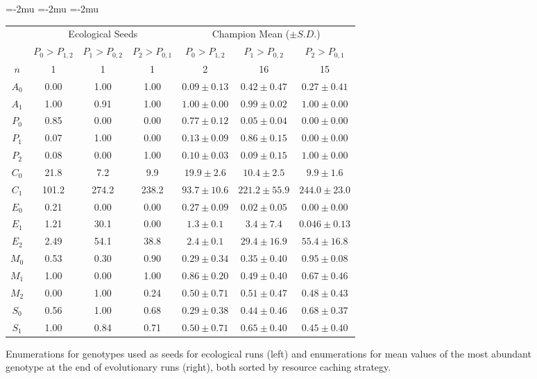 \begin{figure}[t]

\begin{center}
\setlength\tabcolsep{1.5pt} %
\medmuskip=-2mu
\thinmuskip=-2mu
\thickmuskip=-2mu
\nulldelimiterspace=-1pt
\scriptspace=0pt
\begin{tabular}{ | c || c c c | c c c | }
  \multicolumn{1}{c}{} & \multicolumn{3}{c}{Ecological Seeds} & \multicolumn{3}{c}{Champion Mean ($\pm S.D.$)} \\
 \cline{2-7}
  \multicolumn{1}{c|}{} & \tiny{$P_0 > P_{1,2}$} & \tiny{$P_1 > P_{0,2}$} & \tiny{$P_2 > P_{0,1}$} & \tiny{$P_0 > P_{1,2}$} & \tiny{$P_1 > P_{0,2}$} & \tiny{$P_2 > P_{0,1}$}  \\
 \hline
 $n$ & 1 & 1 & 1 & 2 & 16 & 15  \\
 \hhline{|=||===|===|}
 $A_0$ & 0.00 & 1.00 & 1.00 & $0.09 \pm 0.13$ & $0.42 \pm 0.47$ & $0.27 \pm 0.41$ \\
 $A_1$ & 1.00 & 0.91 & 1.00 & $1.00 \pm  0.00$ & $0.99 \pm 0.02$ & $1.00 \pm 0.00$ \\
 \hline
 $P_0$ & 0.85 & 0.00 & 0.00 & $0.77 \pm 0.12$ & $0.05 \pm 0.04$ & $0.00 \pm 0.00$ \\
 $P_1$ & 0.07 & 1.00 & 0.00 & $0.13 \pm 0.09$ & $0.86 \pm 0.15$ & $0.00 \pm 0.00$ \\
 $P_2$ & 0.08 & 0.00 & 1.00 & $0.10 \pm 0.03$ & $0.09 \pm 0.15$ & $1.00 \pm 0.00$ \\
 \hline
 $C_0$ & 21.8 & 7.2 & 9.9 & $19.9 \pm 2.6$ & $10.4 \pm 2.5$ & $9.9 \pm 1.6$ \\
 $C_1$ & 101.2 & 274.2 & 238.2 & $93.7 \pm 10.6$ & $221.2 \pm 55.9$ & $244.0 \pm 23.0 $ \\
 \hline
 $E_0$ & 0.21 & 0.00 & 0.00 & $0.27 \pm 0.09$ & $0.02 \pm 0.05$ & $0.00 \pm 0.00$ \\
 $E_1$ & 1.21 & 30.1 & 0.00 & $1.3 \pm 0.1$ & $3.4 \pm 7.4$ & $0.046 \pm 0.13$ \\
 $E_2$ & 2.49 & 54.1 & 38.8 & $2.4 \pm 0.1$ & $29.4 \pm 16.9$ & $55.4 \pm 16.8$ \\
 \hline
 $M_0$ & 0.53 & 0.30 & 0.90 & $0.29 \pm 0.34$ & $0.35 \pm 0.40$ & $0.95 \pm 0.08$ \\
 $M_1$ & 1.00 & 0.00 & 1.00 & $0.86 \pm 0.20$ & $0.49 \pm 0.40$ & $0.67 \pm 0.46$ \\
 $M_2$ & 0.00 & 1.00 & 0.24 & $0.50 \pm 0.71$ & $0.51 \pm 0.47$ & $0.48 \pm 0.43$ \\
 \hline
 $S_0$ & 0.56 & 1.00 & 0.68 & $0.29 \pm 0.38$ & $0.44 \pm 0.46$ & $0.68 \pm 0.37$ \\
 $S_1$ & 1.00 & 0.84 & 0.71 & $0.50 \pm 0.71$ & $0.65 \pm 0.40$ & $0.45 \pm 0.40$ \\
 \hline
\end{tabular}
\end{center}
\caption{
Enumerations for genotypes used as seeds for ecological runs (left) and enumerations for mean values of the most abundant genotype at the end of evolutionary runs (right), both sorted by resource caching strategy.
}
\label{fig:genotypes}
\end{figure}
